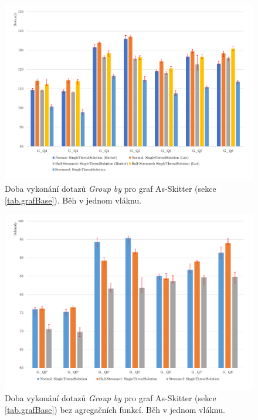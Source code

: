 \begin{figure}[!htp]
\includegraphics[width=\linewidth]{../img/skitterGroupByST.pdf}\centering
\caption{Doba vykonání dotazů \textit{Group by} pro graf As-Skitter (sekce \ref{tab.grafBase}). Běh v jednom vláknu.}
\label{figure.skitterGroupByST}
\end{figure}
\begin{figure}[!htp]
\includegraphics[width=\linewidth]{../img/skitterGroupBySTNoAgg.pdf}\centering
\caption{Doba vykonání dotazů \textit{Group by} pro graf As-Skitter (sekce \ref{tab.grafBase}) bez agregačních funkcí. Běh v jednom vláknu.}
\label{figure.skitterGroupBySTNoAgg}
\end{figure}



\clearpage

